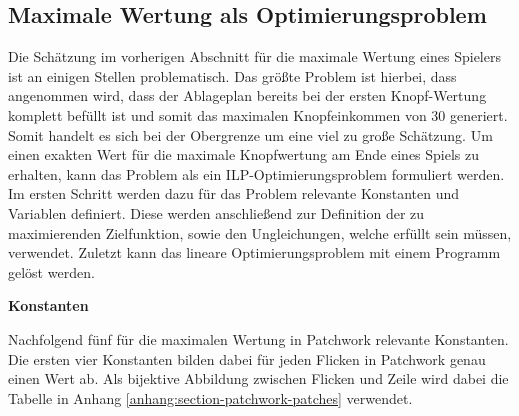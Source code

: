 \subsection*{Maximale Wertung als Optimierungsproblem}

Die Schätzung im vorherigen Abschnitt für die maximale Wertung eines Spielers ist an einigen Stellen problematisch. Das größte Problem ist hierbei, dass angenommen wird, dass der Ablageplan bereits bei der ersten Knopf-Wertung komplett befüllt ist und somit das maximalen Knopfeinkommen von $30$ generiert. Somit handelt es sich bei der Obergrenze um eine viel zu große Schätzung. Um einen exakten Wert für die maximale Knopfwertung am Ende eines Spiels zu erhalten, kann das Problem als ein \ac{ILP}-Optimierungsproblem formuliert werden. Im ersten Schritt werden dazu für das Problem relevante Konstanten und Variablen definiert. Diese werden anschließend zur Definition der zu maximierenden Zielfunktion, sowie den Ungleichungen, welche erfüllt sein müssen, verwendet. Zuletzt kann das lineare Optimierungsproblem mit einem Programm gelöst werden.

\textbf{Konstanten}

Nachfolgend fünf für die maximalen Wertung in Patchwork relevante Konstanten. Die ersten vier Konstanten bilden dabei für jeden Flicken in Patchwork genau einen Wert ab. Als bijektive Abbildung zwischen Flicken und Zeile wird dabei die Tabelle in Anhang \ref{anhang:section-patchwork-patches} verwendet.

\renewcommand{\arraystretch}{0.6666}

